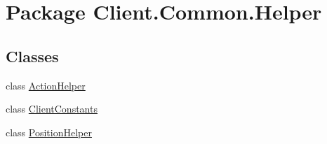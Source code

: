 \hypertarget{namespaceClient_1_1Common_1_1Helper}{\section{Package Client.\-Common.\-Helper}
\label{namespaceClient_1_1Common_1_1Helper}
}
\subsection*{Classes}
\begin{DoxyCompactItemize}
\item 
class \hyperlink{classClient_1_1Common_1_1Helper_1_1ActionHelper}{Action\-Helper}
\item 
class \hyperlink{classClient_1_1Common_1_1Helper_1_1ClientConstants}{Client\-Constants}
\item 
class \hyperlink{classClient_1_1Common_1_1Helper_1_1PositionHelper}{Position\-Helper}
\end{DoxyCompactItemize}
